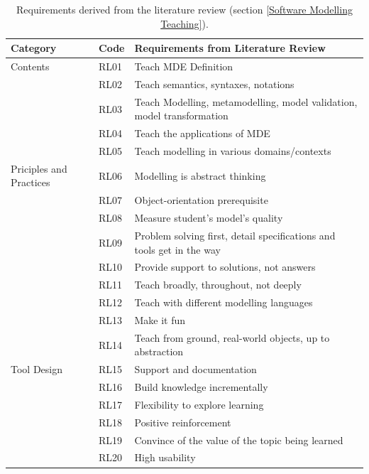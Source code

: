 \documentclass[12pt, a4paper]{report}
\begin{document}
\begin{table}[ht]\caption{Requirements derived from the literature review (section \ref{Software Modelling Teaching}).}
\label{table:requirements}
\begin{center}
\begin{tabular}{ p{2cm}p{1cm}p{10cm} } 
\hline
Category & Code & Requirements from Literature Review \\
\hline
\multirow{1}{2cm}{Contents} 
& RL01 & Teach MDE Definition \\ 
& RL02 & Teach semantics, syntaxes, notations \\ 
& RL03 & Teach Modelling, metamodelling, model validation, model transformation\\
& RL04 & Teach the applications of MDE \\
& RL05 & Teach modelling in various domains/contexts \\

\hline
\multirow{1}{2cm}{Priciples and Practices} 
& RL06 & Modelling is abstract thinking \\ 
& RL07 & Object-orientation prerequisite \\
& RL08 & Measure student's model's quality \\
& RL09 & Problem solving first, detail specifications and tools get in the way \\
& RL10 & Provide support to solutions, not answers \\ 
& RL11 & Teach broadly, throughout, not deeply \\
& RL12 & Teach with different modelling languages \\ 
& RL13 & Make it fun \\ 
& RL14 & Teach from ground, real-world objects, up to abstraction \\ 

\hline
\multirow{1}{2cm}{Tool Design}
& RL15 & Support and documentation \\
& RL16 & Build knowledge incrementally \\
& RL17 & Flexibility to explore learning \\
& RL18 & Positive reinforcement \\
& RL19 & Convince of the value of the topic being learned \\ 
& RL20 & High usability \\ 
\hline
\end{tabular}
\end{center}
\end{table}
\end{document}
